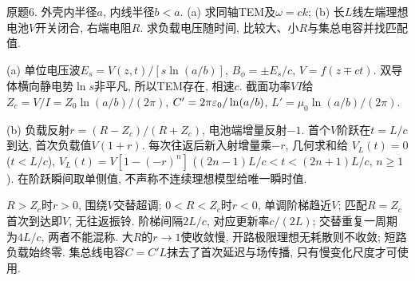 \begin{exercise}
原题6. 外壳内半径$a$, 内线半径$b<a$. (a) 求同轴TEM及$\omega=ck$; (b) 长$L$线左端理想电池$V$开关闭合, 右端电阻$R$. 求负载电压随时间, 比较大、小$R$与集总电容并找匹配值.
\end{exercise}
\begin{solution}
(a) 单位电压波$E_s=V(z,t)/[s\ln(a/b)]$, $B_\phi=\pm E_s/c$, $V=f(z\mp ct)$. 双导体横向静电势$\ln s$非平凡, 所以TEM存在, 相速$c$. 截面功率$VI$给$Z_c=V/I=Z_0\ln(a/b)/(2\pi)$, $C'=2\pi\varepsilon_0/\ln(a/b)$, $L'=\mu_0\ln(a/b)/(2\pi)$.

(b) 负载反射$r=(R-Z_c)/(R+Z_c)$, 电池端增量反射$-1$. 首个$V$阶跃在$t=L/c$到达, 首次负载值$V(1+r)$. 每次往返后新入射增量乘$-r$, 几何求和给
$V_L(t)=0$ ($t<L/c$), $V_L(t)=V[1-(-r)^n]$ ($(2n-1)L/c<t<(2n+1)L/c$, $n\ge1$). 在阶跃瞬间取单侧值, 不声称不连续理想模型给唯一瞬时值.

$R>Z_c$时$r>0$, 围绕$V$交替超调; $0<R<Z_c$时$r<0$, 单调阶梯趋近$V$; 匹配$R=Z_c$首次到达即$V$, 无往返振铃. 阶梯间隔$2L/c$, 对应更新率$c/(2L)$; 交替重复一周期为$4L/c$, 两者不能混称. 大$R$的$r\to1$使收敛慢, 开路极限理想无耗散则不收敛; 短路负载始终零. 集总线电容$C=C'L$抹去了首次延迟与场传播, 只有慢变化尺度才可使用.
\begin{center}\hspace{1em}\qedhere\end{center}
\end{solution}
